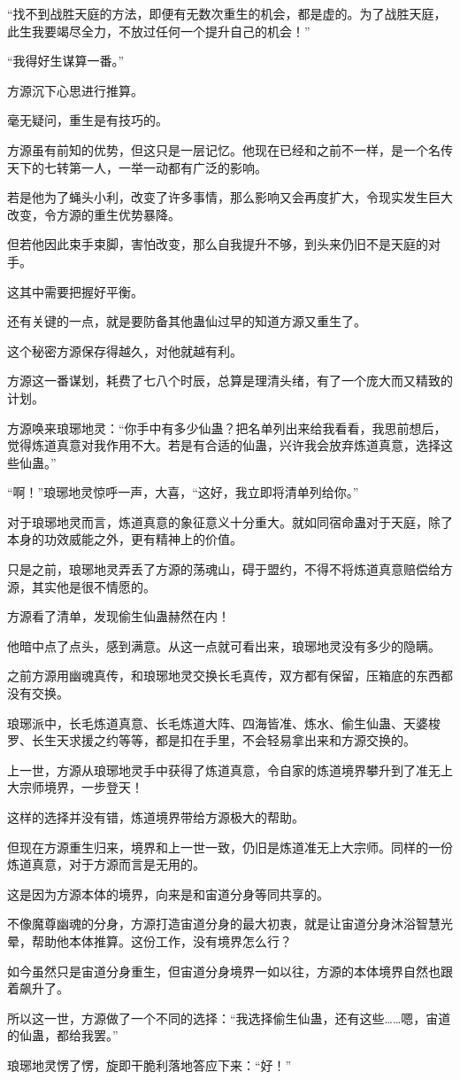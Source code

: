 \begin{this_body}
“找不到战胜天庭的方法，即便有无数次重生的机会，都是虚的。为了战胜天庭，此生我要竭尽全力，不放过任何一个提升自己的机会！”

“我得好生谋算一番。”

方源沉下心思进行推算。

毫无疑问，重生是有技巧的。

方源虽有前知的优势，但这只是一层记忆。他现在已经和之前不一样，是一个名传天下的七转第一人，一举一动都有广泛的影响。

若是他为了蝇头小利，改变了许多事情，那么影响又会再度扩大，令现实发生巨大改变，令方源的重生优势暴降。

但若他因此束手束脚，害怕改变，那么自我提升不够，到头来仍旧不是天庭的对手。

这其中需要把握好平衡。

还有关键的一点，就是要防备其他蛊仙过早的知道方源又重生了。

这个秘密方源保存得越久，对他就越有利。

方源这一番谋划，耗费了七八个时辰，总算是理清头绪，有了一个庞大而又精致的计划。

方源唤来琅琊地灵：“你手中有多少仙蛊？把名单列出来给我看看，我思前想后，觉得炼道真意对我作用不大。若是有合适的仙蛊，兴许我会放弃炼道真意，选择这些仙蛊。”

“啊！”琅琊地灵惊呼一声，大喜，“这好，我立即将清单列给你。”

对于琅琊地灵而言，炼道真意的象征意义十分重大。就如同宿命蛊对于天庭，除了本身的功效威能之外，更有精神上的价值。

只是之前，琅琊地灵弄丢了方源的荡魂山，碍于盟约，不得不将炼道真意赔偿给方源，其实他是很不情愿的。

方源看了清单，发现偷生仙蛊赫然在内！

他暗中点了点头，感到满意。从这一点就可看出来，琅琊地灵没有多少的隐瞒。

之前方源用幽魂真传，和琅琊地灵交换长毛真传，双方都有保留，压箱底的东西都没有交换。

琅琊派中，长毛炼道真意、长毛炼道大阵、四海皆准、炼水、偷生仙蛊、天婆梭罗、长生天求援之约等等，都是扣在手里，不会轻易拿出来和方源交换的。

上一世，方源从琅琊地灵手中获得了炼道真意，令自家的炼道境界攀升到了准无上大宗师境界，一步登天！

这样的选择并没有错，炼道境界带给方源极大的帮助。

但现在方源重生归来，境界和上一世一致，仍旧是炼道准无上大宗师。同样的一份炼道真意，对于方源而言是无用的。

这是因为方源本体的境界，向来是和宙道分身等同共享的。

不像魔尊幽魂的分身，方源打造宙道分身的最大初衷，就是让宙道分身沐浴智慧光晕，帮助他本体推算。这份工作，没有境界怎么行？

如今虽然只是宙道分身重生，但宙道分身境界一如以往，方源的本体境界自然也跟着飙升了。

所以这一世，方源做了一个不同的选择：“我选择偷生仙蛊，还有这些……嗯，宙道的仙蛊，都给我罢。”

琅琊地灵愣了愣，旋即干脆利落地答应下来：“好！”

\end{this_body}

